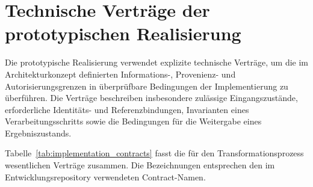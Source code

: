 \section{Technische Verträge der prototypischen Realisierung}
\label{app:implementation_contracts}

Die prototypische Realisierung verwendet explizite technische Verträge, um
die im Architekturkonzept definierten Informations-, Provenienz- und
Autorisierungsgrenzen in überprüfbare Bedingungen der Implementierung zu
überführen. Die Verträge beschreiben insbesondere zulässige
Eingangszustände, erforderliche Identitäts- und Referenzbindungen,
Invarianten eines Verarbeitungsschritts sowie die Bedingungen für die
Weitergabe eines Ergebniszustands.

Tabelle~\ref{tab:implementation_contracts} fasst die für den
Transformationsprozess wesentlichen Verträge zusammen. Die Bezeichnungen
entsprechen den im Entwicklungsrepository verwendeten Contract-Namen.

